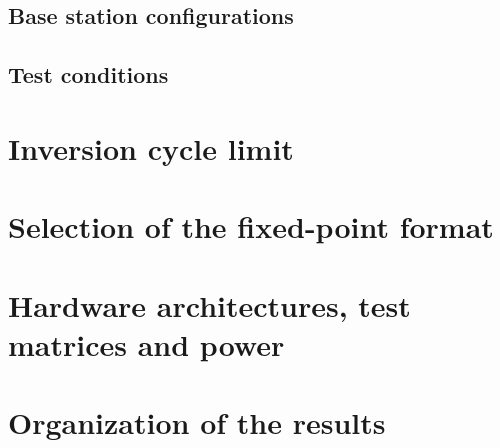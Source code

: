 \subsection{\texorpdfstring{Base station configurations}{Base station configurations}}\label{subsec:configuracoes-bs}


\subsection{Test conditions}\label{subsec:setup_condicoes}


\section{\texorpdfstring{Inversion cycle limit}{Inversion cycle limit}}\label{sec:requisitos-tempo}


\section{\texorpdfstring{Selection of the fixed-point format}{Selection of the fixed-point format}}\label{sec:formato}


\section{\texorpdfstring{Hardware architectures, test matrices and power}{Hardware architectures, test matrices and power}}\label{sec:testes-hardware}


\section{\texorpdfstring{Organization of the results}{Organization of the results}}\label{sec:organizacao-resultados}


